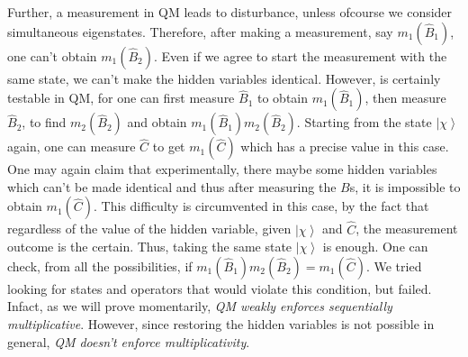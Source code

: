 Further, a measurement in QM leads to disturbance, unless ofcourse
we consider simultaneous eigenstates. Therefore, after making a measurement,
say $m_{1}(\hat{B}_{1})$, one can't obtain $m_{1}(\hat{B}_{2})$.
Even if we agree to start the measurement with the same state, we
can't make the hidden variables identical. However, 
is certainly testable in QM, for one can first measure $\hat{B}_{1}$
to obtain $m_{1}(\hat{B}_{1})$, then measure $\hat{B}_{2}$, to find
$m_{2}(\hat{B}_{2})$ and obtain $m_{1}(\hat{B}_{1})m_{2}(\hat{B}_{2})$.
Starting from the state $\left|\chi\right\rangle $ again, one can
measure $\hat{C}$ to get $m_{1}(\hat{C})$ which has a precise value
in this case. One may again claim that experimentally, there maybe
some hidden variables which can't be made identical and thus after
measuring the $B$s, it is impossible to obtain $m_{1}(\hat{C})$.
This difficulty is circumvented in this case, by the fact that regardless
of the value of the hidden variable, given $\left|\chi\right\rangle $
and $\hat{C}$, the measurement outcome is the certain. Thus, taking
the same state $\left|\chi\right\rangle $ is enough. One can check,
from all the possibilities, if $m_{1}(\hat{B}_{1})m_{2}(\hat{B}_{2})=m_{1}(\hat{C})$.
We tried looking for states and operators that would violate this
condition, but failed. Infact, as we will prove momentarily, \emph{QM
weakly enforces sequentially multiplicative}. However, since restoring
the hidden variables is not possible in general, \emph{QM doesn't
enforce multiplicativity}.

